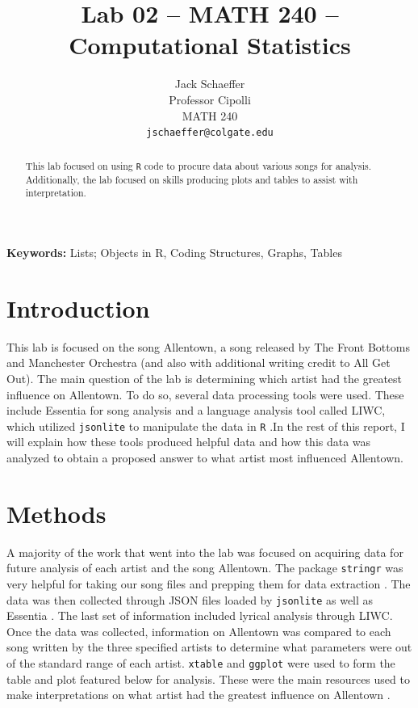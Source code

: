 \documentclass{article}\usepackage[]{graphicx}\usepackage[]{xcolor}
\begin{document}
\vspace{-1in}
\title{Lab 02 -- MATH 240 -- Computational Statistics}

\author{
  Jack Schaeffer \\
  Professor Cipolli \\
  MATH 240 \\
  {\tt jschaeffer@colgate.edu}
}

\date{}

\maketitle

\begin{multicols}{2}
\begin{abstract}
This lab focused on using \texttt{R} code to procure data about various songs for analysis. Additionally, the lab focused on skills producing plots and tables to assist with interpretation.
\end{abstract}

\noindent \textbf{Keywords:} Lists; Objects in R, Coding Structures, Graphs, Tables

\section{Introduction}
This lab is focused on the song Allentown, a song released by The Front Bottoms and Manchester Orchestra (and also with additional writing credit to All Get Out). The main question of the lab is determining which artist had the greatest influence on Allentown. To do so, several data processing tools were used. These include Essentia for song analysis and a language analysis tool called LIWC, which utilized \texttt{jsonlite} to manipulate the data in \texttt{R} \citep{essentia} \citep{jsonlite}.In the rest of this report, I will explain how these tools produced helpful data and how this data was analyzed to obtain a proposed answer to what artist most influenced Allentown.

\section{Methods}

A majority of the work that went into the lab was focused on acquiring data for future analysis of each artist and the song Allentown. The package \texttt{stringr} was very helpful for taking our song files and prepping them for data extraction \citep{stringr}. The data was then collected through JSON files loaded by \texttt{jsonlite} as well as Essentia \citep{jsonlite} \citep{essentia}. The last set of information included lyrical analysis through LIWC. Once the data was collected, information on Allentown was compared to each song written by the three specified artists to determine what parameters were out of the standard range of each artist. \texttt{xtable} and \texttt{ggplot} were used to form the table and plot featured below for analysis. These were the main resources used to make interpretations on what artist had the greatest influence on Allentown \citep{xtable} \citep{ggplot2}.


\end{multicols}
\end{document}
